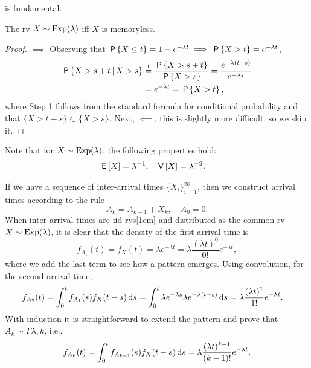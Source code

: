\documentclass[stochastic-or.tex]{subfiles}
\begin{document}
 is fundamental.
\begin{theorem}
The rv $X\sim \Exp{\lambda}$ iff $X$ is memoryless.
\end{theorem}
\begin{proof}
$\implies$ Observing that $\P{X \leq t} = 1- e^{-\lambda t} \implies \P{X>t} = e^{-\lambda t}$,
\begin{align*}
 \P{X > s+t \given X>s} &\stackrel1= \frac{\P{X>s+t}}{\P{X>s}} = \frac{e^{-\lambda(t+s)}}{e^{-\lambda s}} \\
  &= e^{-\lambda t} =\P{X>t},
\end{align*}
where Step 1 follows from the standard formula for conditional probability and that $\{X>t+s\} \subset \{X>s\}$.
Next, $\impliedby$,  this is slightly more difficult, so we skip it. 
\end{proof}


Note that for $X\sim \Exp{\lambda}$, the following properties hold:
  \begin{align*}
  \E X &= \lambda^{-1},  &
\V X &= \lambda^{-2}.
\end{align*}

If we have a sequence of inter-arrival times $\{X_{i}\}_{i=1}^{\infty}$, then we construct arrival times according to the rule
\begin{equation*}
A_{k} = A_{k-1} + X_{k}, \quad  A_{0} = 0.
\end{equation*}
When inter-arrival times are iid rvs[1cm] and distributed as the common rv $X\sim \Exp{\lambda}$, it is clear that the density of the first arrival time is
\begin{equation*}
 f_{A_{1}}(t) = f_{X} (t) = \lambda e^{-\lambda t} = \lambda \frac{(\lambda t)^{0}}{0!} e^{-\lambda t},
\end{equation*}
where we add the last term to see how a pattern emerges.
Using convolution, for the second arrival time,
\begin{align*}
  f_{A_{2}}(t) &=\int_{0}^{t} f_{A_1}(s) f_{X}(t-s)\d s = \int_{0}^{t} \lambda e^{-\lambda s} \lambda e^{-\lambda(t-s)}\d s = \lambda \frac{(\lambda t)^1}{1!} e^{-\lambda t}.
\end{align*}
With induction it  is straightforward to extend the pattern and prove that $A_{k} \sim \Gamma{\lambda, k}$, i.e.,
\begin{equation}\label{eq:e-37}
f_{A_k}(t) = \int_{0}^{t}f_{A_{k-1}}(s) f_X(t-s)\d s = \lambda \frac{(\lambda t)^{k-1}}{(k-1)!} e^{-\lambda t}.
\end{equation}
\end{document}

